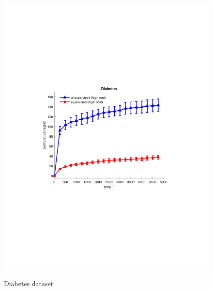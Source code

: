 \begin{figure}[!bt]
\begin{minipage}{4cm}
		\includegraphics[scale=0.3]{../Simulations/Figures/Diabetes_WD1}
		\label{fig:Diabetes}
		\vspace{-1cm}
		\caption{Diabetes dataset}
	\end{minipage}
	\begin{minipage}{4cm}
		\centering

\end{minipage}
\end{figure}
